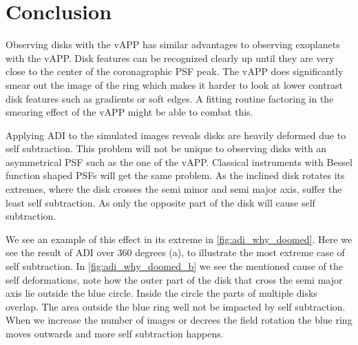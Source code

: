 
%

\section{Conclusion}

Observing disks with the \ac{vAPP} has similar advantages to observing exoplanets with the \ac{vAPP}. Disk features can be recognized clearly up until they are very close to the center of the coronagraphic \ac{PSF} peak. The \ac{vAPP} does significantly smear out the image of the ring which makes it harder to look at lower contrast disk features such as gradients or soft edges. A fitting routine factoring in the smearing effect of the \ac{vAPP} might be able to combat this.

Applying \ac{ADI} to the simulated images reveals disks are heavily deformed due to self subtraction. This problem will not be unique to observing disks with an asymmetrical \ac{PSF} such as the one of the \ac{vAPP}. Classical instruments with Bessel function shaped \acp{PSF} will get the same problem. As the inclined disk rotates its extremes, where the disk crosses the semi minor and semi major axis, suffer the least self subtraction. As only the opposite part of the disk will cause self subtraction. 

We see an example of this effect in its extreme in \autoref{fig:adi_why_doomed}. Here we see the result of \ac{ADI} over 360 degrees (a), to illustrate the most extreme case of self subtraction. In \autoref{fig:adi_why_doomed_b} we see the mentioned cause of the self deformations, note how the outer part of the disk that cross the semi major axis lie outside the blue circle. Inside the circle the parts of multiple disks overlap. The area outside the blue ring well not be impacted by self subtraction. When we increase the number of images or decrees the field rotation the blue ring moves outwards and more self subtraction happens.

